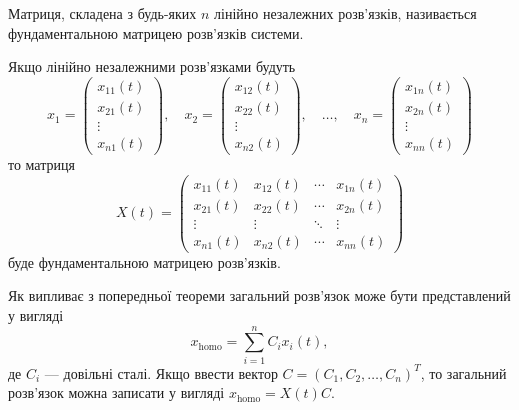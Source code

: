 \begin{definition}
	Матриця, складена з будь-яких $n$ лінійно незалежних роз\-в'яз\-ків, називається фундаментальною матрицею розв'язків системи.
\end{definition}

Якщо лінійно незалежними розв'язками будуть \[ x_1 = \begin{pmatrix} x_{11}(t) \\ x_{21}(t) \\ \vdots \\ x_{n1}(t) \end{pmatrix}, \quad x_2 = \begin{pmatrix} x_{12}(t) \\ x_{22}(t) \\ \vdots \\ x_{n2}(t) \end{pmatrix}, \quad \ldots, \quad x_n = \begin{pmatrix} x_{1n}(t) \\ x_{2n}(t) \\ \vdots \\ x_{nn}(t) \end{pmatrix} \] то матриця
\begin{equation*}
	X(t) = \begin{pmatrix} x_{11} (t) & x_{12} (t) & \cdots & x_{1n} (t) \\ x_{21} (t) & x_{22} (t) & \cdots & x_{2n} (t) \\ \vdots & \vdots & \ddots & \vdots \\ x_{n1} (t) & x_{n2} (t) & \cdots & x_{nn} (t) \end{pmatrix}
\end{equation*}
буде фундаментальною матрицею розв'язків. \parvskip

Як випливає з попередньої теореми загальний розв'язок може бути представлений у вигляді
\begin{equation*}
	x_{\text{homo}} = \sum_{i = 1}^n C_i x_i(t),
\end{equation*}
де $C_i$ --- довільні сталі. Якщо ввести вектор $C = (C_1, C_2, \ldots, C_n)^T$, то загальний розв'язок можна записати у вигляді $x_{\text{homo}} = X(t) C$.
